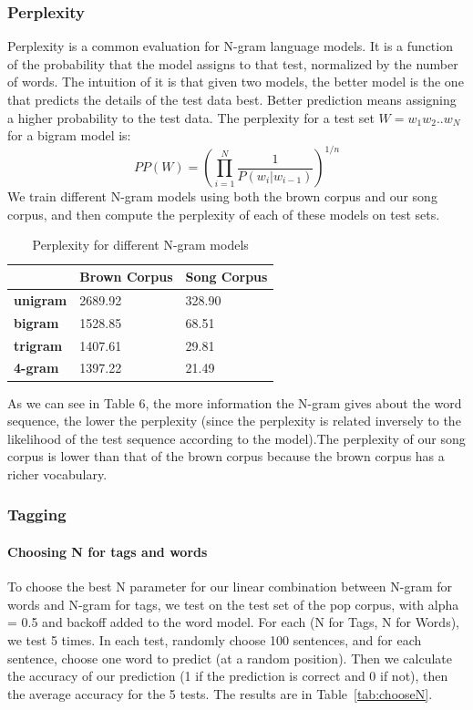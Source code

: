 \documentclass[a4paper,12pt]{article}
\begin{document}
\subsubsection{Perplexity}
Perplexity is a common evaluation for N-gram language models. It is a function of
the probability that the model assigns to that test, normalized by the number of words.
The intuition of it is that given two models, the better model is the one that predicts the details of the test data best. Better prediction means assigning a higher probability to the test data.
The perplexity for a test set $W = w_1w_2..w_N$ for a bigram model is:
\begin{equation}
PP(W) = (\prod_{i=1}^{N} \frac{1}{P(w_i|w_{i-1})})^{1/n}
\end{equation}
We train different N-gram models using both the brown corpus and our song corpus, and then compute the perplexity of each of these models on test sets. 
\begin{table}[]
\centering
\caption{Perplexity for different N-gram models}
\label{perplexity}
\begin{tabular}{|l|l|l|}
\hline
                 & \textbf{Brown Corpus} & \textbf{Song Corpus} \\ \hline
\textbf{unigram} & 2689.92               & 328.90               \\ \hline
\textbf{bigram}  & 1528.85               & 68.51                \\ \hline
\textbf{trigram} & 1407.61               & 29.81                \\ \hline
\textbf{4-gram}  & 1397.22               & 21.49                \\ \hline
\end{tabular}
\end{table}
As we can see in Table 6, the more information the N-gram gives about the word sequence, the lower the perplexity (since the perplexity is related inversely to the likelihood of the test sequence according to the model).The perplexity of our song corpus is lower than that of the brown corpus because the brown corpus has a richer vocabulary.   

\subsubsection{Tagging}
\paragraph{Choosing N for tags and words}
To choose the best N parameter for our linear combination between N-gram for words and N-gram for tags, we test on the test set of the pop corpus, with alpha = 0.5 and backoff added to the word model. For each (N for Tags, N for Words), we test 5 times. In each test, randomly choose 100 sentences, and for each sentence, choose one word to predict (at a random position). Then we calculate the accuracy of our prediction (1 if the prediction is correct and 0 if not), then the average accuracy for the 5 tests. The results are in Table~\ref{tab:chooseN}.
\end{document}
